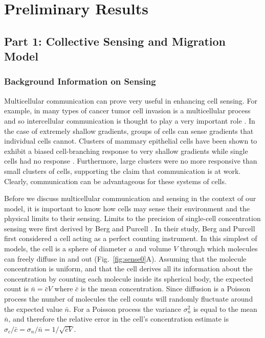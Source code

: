 \documentclass[phys,prelim]{puthesis}
\begin{document}
\chapter{Preliminary Results}

\section{Part 1: Collective Sensing and Migration Model}

\subsection{Background Information on Sensing}

Multicellular communication can prove very useful in enhancing cell sensing. For example, in many types of cancer tumor cell invasion is a multicellular process and so intercellular communication is thought to play a very important role \cite{cheung2013collective,friedl2012classifying,varennes2015sense}. In the case of extremely shallow gradients, groups of cells can sense gradients that individual cells cannot. Clusters of mammary epithelial cells have been shown to exhibit a biased cell-branching response to very shallow gradients while single cells had no response \cite{ellison2015cell}. Furthermore, large clusters were no more responsive than small clusters of cells, supporting the claim that communication is at work. Clearly, communication can be advantageous for these systems of cells.

Before we discuss multicellular communication and sensing in the context of our model, it is important to know how cells may sense their environment and the physical limits to their sensing. Limits to the precision of single-cell concentration sensing were first derived by Berg and Purcell \cite{berg1977physics}. In their study, Berg and Purcell first considered a cell acting as a perfect counting instrument. In this simplest of models, the cell is a sphere of diameter $a$ and volume $V$ through which molecules can freely diffuse in and out (Fig.\ \ref{fig:sense0}A). Assuming that the molecule concentration is uniform, and that the cell derives all its information about the concentration by counting each molecule inside its spherical body, the expected count is $\bar{n} = \bar{c}V$ where $\bar{c}$ is the mean concentration. Since diffusion is a Poisson process the number of molecules the cell counts will randomly fluctuate around the expected value $\bar{n}$. For a Poisson process the variance $\sigma_n^2$ is equal to the mean $\bar{n}$, and therefore the relative error in the cell's concentration estimate is
$\sigma_c/\bar{c} = \sigma_n/\bar{n} = 1/\sqrt{\bar{c} V}$.
\end{document}
